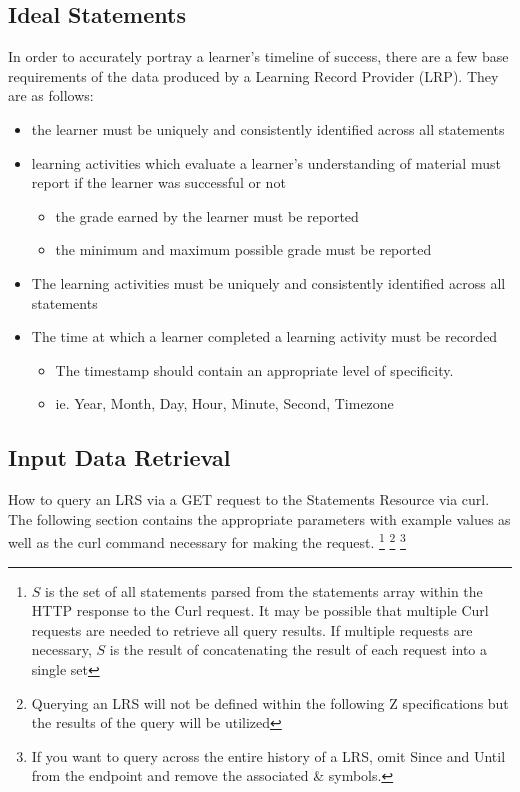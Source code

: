 \documentclass{article}
\begin{document}
\subsection{Ideal Statements}
In order to accurately portray a learner's timeline of success, there
are a few base requirements of the data produced by a Learning Record
Provider (LRP). They are as follows:

\begin{itemize}
\item the learner must be uniquely and consistently identified across
  all statements
\item learning activities which evaluate a learner's understanding of material must report if the learner was successful or not
  \begin{itemize}
  \item the grade earned by the learner must be reported
  \item the minimum and maximum possible grade must be reported
  \end{itemize}
\item The learning activities must be uniquely and consistently identified across all statements
\item The time at which a learner completed a learning activity must be recorded
  \begin{itemize}
  \item The timestamp should contain an appropriate level of specificity.
  \item ie. Year, Month, Day, Hour, Minute, Second, Timezone
  \end{itemize}
\end{itemize}

\subsection{Input Data Retrieval}
How to query an LRS via a GET request to the Statements Resource via
curl. The following section contains the appropriate parameters with
example values as well as the curl command necessary for making the request.
\footnote{\label{moreLink} $S$ is the set of all statements parsed
  from the statements array within the HTTP response to the Curl
  request. It may be possible that multiple Curl requests are needed
  to retrieve all query results. If multiple requests are necessary,
  $S$ is the result of concatenating the result of each request into
  a single set}
\footnote{\label{noZ} Querying an LRS will not be defined within the
  following Z specifications but the results of the query will be utilized}
\footnote{\label{allTime} If you want to query across the entire
  history of a LRS, omit Since and Until from the endpoint and remove
  the associated \& symbols.}
\end{document}
